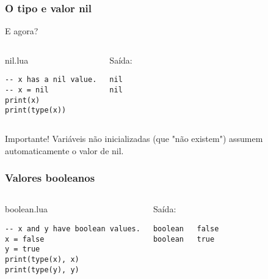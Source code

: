 \documentclass[brazil]{beamer}
\begin{document}

\begin{frame}[fragile]
  \frametitle{O tipo e valor nil}
  \begin{center}E agora?\end{center}
  \begin{columns}
      \begin{block}{nil.lua}
        \begin{lstlisting}
-- x has a nil value.
-- x = nil
print(x)
print(type(x))
        \end{lstlisting}
      \end{block}
    \pause
      \begin{block}{Saída:}
        \begin{verbatim}
nil
nil     \end{verbatim}
      \end{block}
  \end{columns}
  \pause
  \begin{center}
    Importante! Variáveis não inicializadas (que "não existem")
    assumem automaticamente o valor de nil.
  \end{center}
\end{frame}


\begin{frame}[fragile]
  \frametitle{Valores booleanos}
  \pause
  \begin{columns}
      \begin{block}{boolean.lua}
        \begin{lstlisting}
-- x and y have boolean values.
x = false
y = true
print(type(x), x)
print(type(y), y)
        \end{lstlisting}
      \end{block}
    \pause
      \begin{block}{Saída:}
        \begin{verbatim}
boolean   false
boolean   true  \end{verbatim}
      \end{block}
  \end{columns}
\end{frame}

\end{document}
